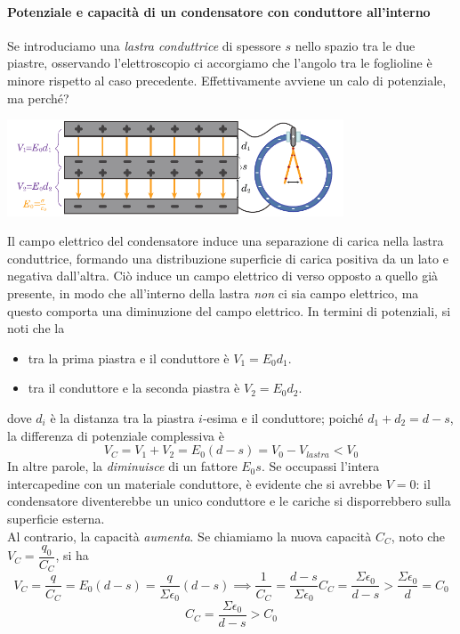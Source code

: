 \paragraph{Potenziale e capacità di un condensatore con conduttore all'interno}
Se introduciamo una \textit{lastra conduttrice} di spessore $s$ nello spazio tra le due piastre, osservando l'elettroscopio ci accorgiamo che l'angolo tra le foglioline è minore rispetto al caso precedente. Effettivamente avviene un calo di potenziale, ma perché?
\begin{center}
	\includegraphics[width=0.75\textwidth]{images/chp6/chp6elettroscopio2.pdf}
\end{center}
Il campo elettrico del condensatore induce una separazione di carica nella lastra conduttrice, formando una distribuzione superficie di carica positiva da un lato e negativa dall'altra. Ciò induce un campo elettrico di verso opposto a quello già presente, in modo che all'interno della lastra \textit{non} ci sia campo elettrico, ma questo comporta una diminuzione del campo elettrico. In termini di potenziali, si noti che la \ddp
\begin{itemize}
	\item tra la prima piastra e il conduttore è $V_1=E_0d_1$.
	\item tra il conduttore e la seconda piastra è $V_2=E_0d_2$.
\end{itemize}
dove $d_i$ è la distanza tra la piastra $i$-esima e il conduttore; poiché $d_1+d_2=d-s$, la differenza di potenziale complessiva è
\begin{equation*}
	V_{C}=V_1+V_2=E_0\left(d-s\right)=V_0-V_{lastra}<V_0
\end{equation*}
In altre parole, la \ddp \textit{diminuisce} di un fattore $E_0s$. Se occupassi l'intera intercapedine con un materiale conduttore, è evidente che si avrebbe $V=0$: il condensatore diventerebbe un unico conduttore e le cariche si disporrebbero sulla superficie esterna.\\
Al contrario, la capacità \textit{aumenta}. Se chiamiamo la nuova capacità $C_C$, noto che $V_{C}=\dfrac{q_0}{C_C}$, si ha
\begin{equation*}
	V_C=\frac{q}{C_C}=E_0\left(d-s\right)=\frac{q}{\Sigma \epsilon_0}\left(d-s\right)\implies \frac{1}{C_C}=\frac{d-s}{\Sigma \epsilon_0}C_C=\frac{\Sigma \epsilon_0}{d-s}>\frac{\Sigma \epsilon_0}{d}=C_0
\end{equation*}
\begin{equation}
	C_C=\frac{\Sigma \epsilon_0}{d-s}>C_0
\end{equation}
